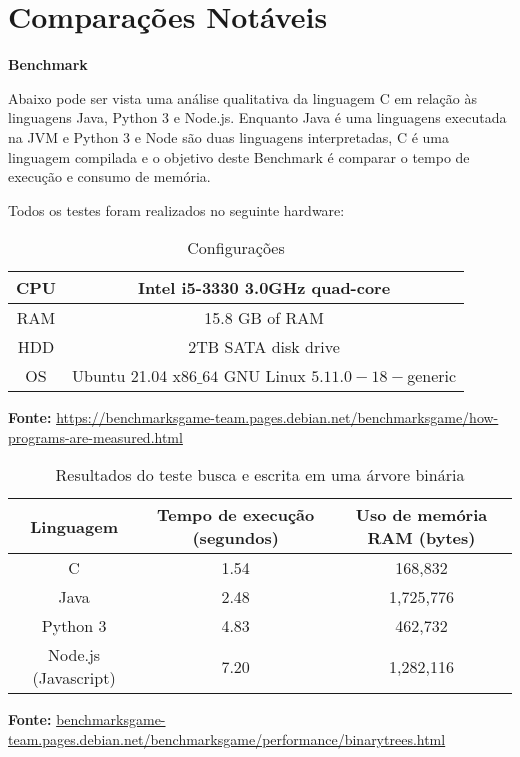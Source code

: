 \chapter{Comparações Notáveis}


\textbf{Benchmark}

Abaixo pode ser vista uma análise qualitativa da linguagem C
 em relação às linguagens Java, Python 3  e Node.js. Enquanto Java é uma linguagens executada na JVM 
 e Python 3 e Node são duas linguagens interpretadas, C é uma linguagem compilada e o 
 objetivo deste Benchmark é comparar o tempo de execução e consumo de memória. 


Todos os testes foram realizados no seguinte hardware:

\begin{table}[ht]
    \centering
    \caption{Configurações}
    \begin{tabular}{| c | c |}
        \hline 
        CPU & Intel i5-3330 3.0GHz quad-core\\
        \hline
        RAM & 15.8 GB of RAM \\
        \hline 
        HDD & 2TB SATA disk drive \\
        \hline
        OS & Ubuntu 21.04 x\(86\_64\) GNU Linux \(5.11.0-18-\)generic \\
        \hline   
    \end{tabular}
    
    \textbf{Fonte:} \url{https://benchmarksgame-team.pages.debian.net/benchmarksgame/how-programs-are-measured.html}
 
\end{table}



\begin{table}[ht]
    \centering
    \caption{Resultados do teste busca e escrita em uma árvore binária}
    \begin{tabular}{| c | c | c |}
        \hline 
        Linguagem & Tempo de execução (segundos)
        & Uso de memória RAM (bytes) \\
        \hline
        C & 1.54 & 168,832 \\
        \hline 
        Java & 2.48 & 1,725,776 \\
        \hline
        Python 3 & 4.83 & 462,732 \\
        \hline
        Node.js (Javascript) & 7.20 & 1,282,116\\ 
        \hline  
              
    \end{tabular}
    \textbf{Fonte:} \url{benchmarksgame-team.pages.debian.net/benchmarksgame/performance/binarytrees.html}
\end{table}

